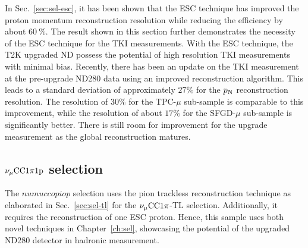      In Sec.~\ref{sec:sel-esc}, it has been shown that the ESC technique has improved the proton momentum reconstruction resolution while reducing the efficiency by about $60~\%$.
     The result shown in this section further demonstrates the necessity of the ESC technique for the TKI measurements.
     With the ESC technique, the T2K upgraded ND possess the potential of high resolution TKI measurements with minimal bias.
     Recently, there has been an update on the TKI measurement at the pre-upgrade ND280 data using an improved reconstruction algorithm.
     This leads to a standard deviation of approximately $27\%$ for the $p_\textrm{N}$ reconstruction resolution. 
     The resolution of $30\%$ for the TPC-$\mu$ sub-sample is comparable to this improvement, while the resolution of about $17\%$ for the SFGD-$\mu$ sub-sample is significantly better.
     There is still room for improvement for the upgrade measurement as the global reconstruction matures.    

     \subsection{$\nu_{\mu}\textrm{CC}1\pi1\textrm{p}$ selection}
     \label{sec:mc-tki-1pi}
     The $numuccopiop$ selection uses the pion trackless reconstruction technique as elaborated in Sec.~\ref{sec:sel-tl} for the $\nu_{\mu}\textrm{CC}1\pi$-TL selection.
     Additionally, it requires the reconstruction of one ESC proton.
     Hence, this sample uses both novel techniques in Chapter~\ref{ch:sel}, showcasing the potential of the upgraded ND280 detector in hadronic measurement.

